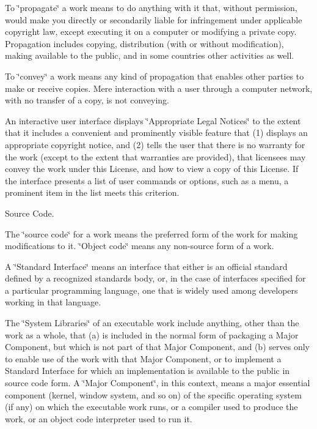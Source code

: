 To \char`\"{}propagate\char`\"{} a work means to do anything with it that, without permission, would make you directly or secondarily liable for infringement under applicable copyright law, except executing it on a computer or modifying a private copy. Propagation includes copying, distribution (with or without modification), making available to the public, and in some countries other activities as well.

To \char`\"{}convey\char`\"{} a work means any kind of propagation that enables other parties to make or receive copies. Mere interaction with a user through a computer network, with no transfer of a copy, is not conveying.

An interactive user interface displays \char`\"{}\+Appropriate Legal Notices\char`\"{} to the extent that it includes a convenient and prominently visible feature that (1) displays an appropriate copyright notice, and (2) tells the user that there is no warranty for the work (except to the extent that warranties are provided), that licensees may convey the work under this License, and how to view a copy of this License. If the interface presents a list of user commands or options, such as a menu, a prominent item in the list meets this criterion.


\begin{DoxyEnumerate}
\item Source Code.
\end{DoxyEnumerate}

The \char`\"{}source code\char`\"{} for a work means the preferred form of the work for making modifications to it. \char`\"{}\+Object code\char`\"{} means any non-\/source form of a work.

A \char`\"{}\+Standard Interface\char`\"{} means an interface that either is an official standard defined by a recognized standards body, or, in the case of interfaces specified for a particular programming language, one that is widely used among developers working in that language.

The \char`\"{}\+System Libraries\char`\"{} of an executable work include anything, other than the work as a whole, that (a) is included in the normal form of packaging a Major Component, but which is not part of that Major Component, and (b) serves only to enable use of the work with that Major Component, or to implement a Standard Interface for which an implementation is available to the public in source code form. A \char`\"{}\+Major Component\char`\"{}, in this context, means a major essential component (kernel, window system, and so on) of the specific operating system (if any) on which the executable work runs, or a compiler used to produce the work, or an object code interpreter used to run it.

